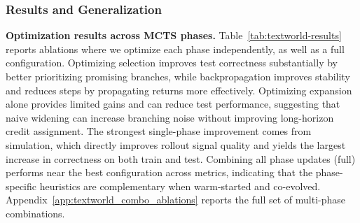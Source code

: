 \documentclass{article}
\begin{document}
\begin{table}[t]
  \caption{Results across configurations on train/test splits. Correct is \#correct/\#total; $\Delta$ is the difference in Correct vs. the baseline on the same split; Ret and Steps are the mean return and mean steps. ``+'' indicates which MCTS phase(s) are optimized.}
  \label{tab:textworld-results}
  \centering
  \small
  \setlength{\tabcolsep}{4pt}
  \vspace{-0.2cm}
\end{table}


\subsubsection{Results and Generalization}
\textbf{Optimization results across MCTS phases.} Table~\ref{tab:textworld-results} reports ablations where we optimize each phase independently, as well as a full configuration. Optimizing selection improves test correctness substantially by better prioritizing promising branches, while backpropagation improves stability and reduces steps by propagating returns more effectively. Optimizing expansion alone provides limited gains and can reduce test performance, suggesting that naive widening can increase branching noise without improving long-horizon credit assignment. The strongest single-phase improvement comes from simulation, which directly improves rollout signal quality and yields the largest increase in correctness on both train and test. Combining all phase updates (full) performs near the best configuration across metrics, indicating that the phase-specific heuristics are complementary when warm-started and co-evolved. Appendix~\ref{app:textworld_combo_ablations} reports the full set of multi-phase combinations.
\end{document}
